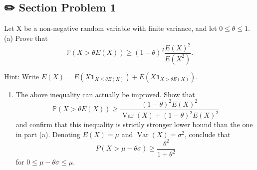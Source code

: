 \documentclass[
  letterpaper,
  DIV=11,
  numbers=noendperiod]{scrreprt}
\providecommand{\tightlist}{%
  \setlength{\itemsep}{0pt}\setlength{\parskip}{0pt}}\usepackage{longtable,booktabs,array}
\theoremstyle{plain}
\theoremstyle{definition}
\theoremstyle{remark}
\begin{document}

\hypertarget{section-problem-1-6}{%
\subsection*{✏️ Section Problem 1}\label{section-problem-1-6}}

Let \(\mathrm{X}\) be a non-negative random variable with finite
variance, and let \(0 \leq \theta \leq 1\). (a) Prove that \[
\mathbb{P}(X>\theta E(X)) \geq(1-\theta)^2 \frac{E(X)^2}{E\left(X^2\right)} .
\]

Hint: Write
\(E(X)=E\left(X \mathbf{1}_{X \leq \theta E(X)}\right)+E\left(X \mathbf{1}_{X>\theta E(X)}\right)\).

\begin{enumerate}
\def\labelenumi{(\alph{enumi})}
\setcounter{enumi}{1}
\tightlist
\item
  The above inequality can actually be improved. Show that \[
  \mathbb{P}(X>\theta E(X)) \geq \frac{(1-\theta)^2 E(X)^2}{\operatorname{Var}(X)+(1-\theta)^2 E(X)^2}
  \] and confirm that this inequality is strictly stronger lower bound
  than the one in part (a). Denoting \(E(X)=\mu\) and
  \(\operatorname{Var}(X)=\sigma^2\), conclude that \[
  P(X>\mu-\theta \sigma) \geq \frac{\theta^2}{1+\theta^2}
  \] for \(0 \leq \mu-\theta \sigma \leq \mu\).
\end{enumerate}
\end{document}
